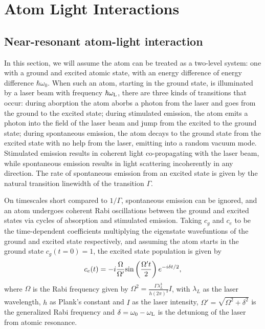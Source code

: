 \renewcommand{\thechapter}{3}

\chapter{Atom Light Interactions}

\section{Near-resonant atom-light interaction}\label{chap:2sec:atomLight}

In this section, we will assume the atom can be treated as a two-level system: one with a ground and excited atomic state, with an energy difference of energy difference $\hbar\omega_0$. When such an atom, starting in the ground state, is illuminated by a laser beam with frequency $\hbar\omega_{\rm{L}}$, there are three kinds of transitions that occur: during aborption the atom aborbs a photon from the laser and goes from the ground to the excited state; during stimulated emission, the atom emits a photon into the field of the laser beam and jump from the excited to the ground state; during spontaneous emission, the atom decays to the ground state from the excited state with no help from the laser, emitting into a random vacuum mode. Stimulated emission results in coherent light co-propagating with the laser beam, while spontaneous emission results in light scattering incoherently in any direction. The rate of spontaneous emission from an excited state is given by the natural transition linewidth of the transition $\Gamma$. 

On timescales short compared to $1/\Gamma$, spontaneous emission can be ignored, and an atom undergoes coherent Rabi oscillations between the ground and excited states via cycles of absorption and stimulated emission\cite{LCT}. Taking $c_g$ and $c_e$ to be the time-dependent coefficients multiplying the eigenstate wavefuntions of the ground and excited state respectively, and assuming the atom starts in the ground state $c_g(t=0)=1$, the excited state population is given by
\begin{equation}
c_e(t)=-i\frac{\Omega}{\Omega'}{\rm sin}\left(\frac{\Omega't}{2}\right)e^{-i\delta t/2},
\end{equation}
where $\Omega$ is the Rabi frequency given by $\Omega^2 = \frac{\Gamma\lambda_L^3}{h(2\pi)^3}I$, with $\lambda_L$ as the laser wavelength, $h$ as Plank's constant and $I$ as the laser intensity,  $\Omega'=\sqrt{\Omega^2+\delta^2}$ is the generalized Rabi frequency and $\delta=\omega_0-\omega_{\rm{L}}$ is the detuniong of the laser from atomic resonance. 

